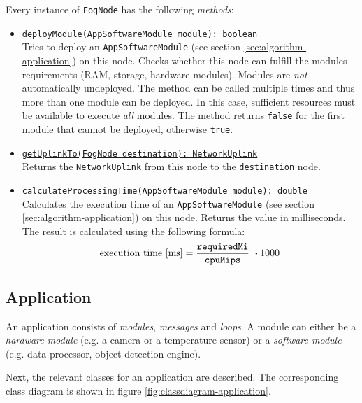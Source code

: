 \begin{itemize}
    Every instance of \texttt{FogNode} has the following \textit{methods}:
    \begin{itemize}
        \item \underline{\texttt{deployModule(AppSoftwareModule module): boolean}}\\ [0.5ex] 
        Tries to deploy an \texttt{AppSoftwareModule} (see section \ref{sec:algorithm-application}) on this node. Checks whether this node can fulfill the modules requirements (RAM, storage, hardware modules). Modules are \textit{not} automatically undeployed. The method can be called multiple times and thus more than one module can be deployed. In this case, sufficient resources must be available to execute \textit{all} modules. The method returns \texttt{false} for the first module that cannot be deployed, otherwise \texttt{true}.
        
        \item \underline{\texttt{getUplinkTo(FogNode destination): NetworkUplink}}\\ [0.5ex] 
        Returns the \texttt{NetworkUplink} from this node to the \texttt{destination} node.
        
        \item \underline{\texttt{calculateProcessingTime(AppSoftwareModule module): double}}\\ [0.5ex] 
        Calculates the execution time of an \texttt{AppSoftwareModule} (see section \ref{sec:algorithm-application}) on this node. Returns the value in milliseconds. The result is calculated using the following formula:
        \[\textrm{execution time [ms]} = \frac{\textrm{\texttt{requiredMi}}}{\textrm{\texttt{cpuMips}}}\ \boldsymbol{\cdot} 1000\]
    \end{itemize}

\end{itemize}


\subsection{Application\label{sec:algorithm-application}}

An application consists of \textit{modules}, \textit{messages} and \textit{loops}. A module can either be a \textit{hardware module} (e.g. a camera or a temperature sensor) or a \textit{software module} (e.g. data processor, object detection engine).

Next, the relevant classes for an application are described. The corresponding class diagram is shown in figure \ref{fig:classdiagram-application}.

